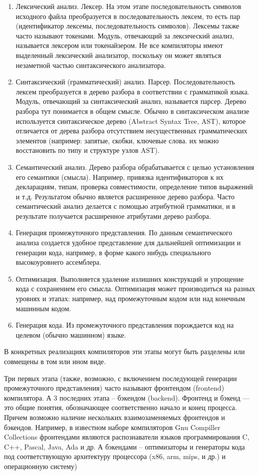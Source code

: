 \documentclass[a4paper,12pt]{article}
\begin{document}
\begin{enumerate}
  \item Лексический анализ. Лексер. На этом этапе последовательность символов
  исходного файла преобразуется в последовательность лексем, то есть пар (идентификатор
  лексемы, последовательность символов). Лексемы также часто называют токенами.
  Модуль, отвечающий за лексический анализ, называется лексером или
  токенайзером. Не все компиляторы имеют выделенный лексический анализатор,
  поскольку он может являться незаметной частью синтаксического анализатора.
  \item Синтаксический (грамматический) анализ. Парсер. Последовательность
  лексем преобразуется в дерево разбора в соответствии с грамматикой языка.
  Модуль, отвечающий за синтаксический анализ, называется парсер. Дерево
  разбора тут понимается в общем смысле. Обычно в синтаксическом анализе
  используется синтаксическое дерево (Abstract Syntax Tree, AST), которое
  отличается от дерева разбора отсутствием несущественных грамматических элементов
  (например: запятые, скобки, ключевые слова. их можно восстановить по
  типу и структуре узлов AST).
  \item Семантический анализ. Дерево разбора обрабатывается с целью
  установления его семантики (смысла). Например, привязка идентификаторов к
  их декларациям, типам, проверка совместимости, определение типов выражений и
  т.д. Результатом обычно является расширенное дерево разбора. Часто
  семантический анализ делается с помощью атрибутной грамматики, и в результате
  получается расширенное атрибутами дерево разбора.
  \item Генерация промежуточного представления. По данным семантического
  анализа создается удобное представление для дальнейшей оптимизации и
  генерации кода, например, в форме какого нибудь специального высокоуровнего
  ассемблера.
  \item Оптимизация. Выполняется удаление излишних конструкций и упрощение кода
  с сохранением его смысла. Оптимизация может производиться на разных уровнях и
  этапах: например, над промежуточным кодом или над конечным машинным кодом.
  \item Генерация кода. Из промежуточного представления порождается код на
  целевом (обычно машинном) языке.
\end{enumerate}
В конкретных реализациях компиляторов эти этапы могут быть разделены или
совмещены в том или ином виде.

Три первых этапа (также, возможно, с включением последующей генерации
промежуточного представления) часто называют фронтендом (frontend) компилятора.
А 3 последних этапа -- бэкендом (backend). Фронтенд и бэкенд --- это общие
понятия, обозначающее соответственно начало и конец процесса. Причем возможно
наличие нескольких взаимозаменяемых фронтендов и бэкендов. Например, в
известном наборе компиляторов Gnu Compiller Collections фронтендами являются
распознаватели языков программирования C, C++, Pascal, Java, Ada и др. А
бэкендами -- оптимизаторы и генераторы кода под соответствующую архитектуру процессора
(x86, arm, mips, и др.) и операционную систему)
\end{document}
